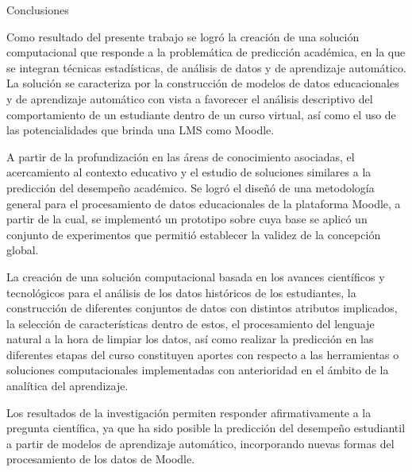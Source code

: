 \begin{conclusions}
    Conclusiones  

    Como resultado del presente trabajo se logró la creación de una solución computacional que responde a la problemática de predicción académica, en la que se integran 
    técnicas estadísticas, de análisis de datos y de aprendizaje automático. La solución se caracteriza por la construcción de modelos de datos educacionales y de aprendizaje automático con vista a favorecer el análisis descriptivo del comportamiento de un estudiante dentro de un curso virtual, así como 
    el uso de las potencialidades que brinda una LMS como Moodle.  

    A partir de la profundización en las áreas de conocimiento asociadas, el acercamiento al contexto educativo y 
    el estudio de soluciones similares a la predicción del desempeño académico. Se logró el diseñó de una metodología general para el procesamiento de datos educacionales de la plataforma Moodle, a partir de la cual, se implementó un prototipo sobre cuya base se aplicó un conjunto de experimentos que 
    permitió establecer la validez de la concepción global.  

    La creación de una solución computacional basada en los avances científicos y tecnológicos para el análisis de los datos históricos de los estudiantes, la construcción de diferentes conjuntos de datos con distintos atributos implicados, la selección de características dentro de estos, el procesamiento del lenguaje natural a la hora de limpiar los datos, así como realizar la predicción en las diferentes etapas del curso 
    constituyen aportes con respecto a las herramientas o soluciones computacionales implementadas con anterioridad en el ámbito de la analítica del aprendizaje.  
    
    Los resultados de la investigación permiten responder afirmativamente a la pregunta científica, ya que ha sido posible la predicción del desempeño estudiantil a partir de modelos de aprendizaje automático, incorporando nuevas formas del procesamiento de los datos de Moodle. 

    
\end{conclusions}
